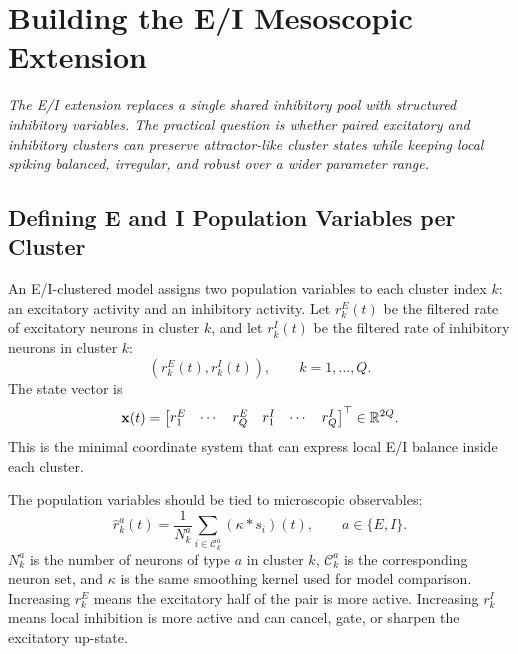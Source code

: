 \chapter{Building the E/I Mesoscopic Extension}
\label{ch:building-ei-mesoscopic-extension}

\textit{The E/I extension replaces a single shared inhibitory pool with structured inhibitory variables. The practical question is whether paired excitatory and inhibitory clusters can preserve attractor-like cluster states while keeping local spiking balanced, irregular, and robust over a wider parameter range.}

\section{Defining E and I Population Variables per Cluster}
\label{sec:defining-e-and-i-population-variables-per-cluster}

An E/I-clustered model assigns two population variables to each cluster index $k$: an excitatory activity and an inhibitory activity. Let $r_k^E(t)$ be the filtered rate of excitatory neurons in cluster $k$, and let $r_k^I(t)$ be the filtered rate of inhibitory neurons in cluster $k$:
%
\begin{equation}
  \left(r_k^E(t),r_k^I(t)\right),
  \qquad
  k=1,\ldots,Q .
  \label{eq:ei-cluster-rate-definitions}
\end{equation}
%
The state vector is
%
\begin{equation}
  \mathbf{x}(t)
  =
  \begin{bmatrix}
  r_1^E & \cdots & r_Q^E & r_1^I & \cdots & r_Q^I
  \end{bmatrix}^{\top}
  \in \mathbb{R}^{2Q}.
  \label{eq:ch22-ei-state-vector}
\end{equation}
%
This is the minimal coordinate system that can express local E/I balance inside each cluster.

The population variables should be tied to microscopic observables:
%
\begin{equation}
  \widehat r_k^a(t)
  =
  \frac{1}{N_k^a}
  \sum_{i\in \mathcal{C}_k^a}
  (\kappa * s_i)(t),
  \qquad
  a\in\{E,I\}.
  \label{eq:empirical-ei-cluster-rates}
\end{equation}
%
$N_k^a$ is the number of neurons of type $a$ in cluster $k$, $\mathcal{C}_k^a$ is the corresponding neuron set, and $\kappa$ is the same smoothing kernel used for model comparison. Increasing $r_k^E$ means the excitatory half of the pair is more active. Increasing $r_k^I$ means local inhibition is more active and can cancel, gate, or sharpen the excitatory up-state.

